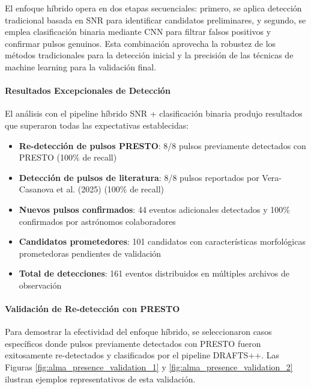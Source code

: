 El enfoque híbrido opera en dos etapas secuenciales: primero, se aplica detección tradicional basada en SNR para identificar candidatos preliminares, y segundo, se emplea clasificación binaria mediante CNN para filtrar falsos positivos y confirmar pulsos genuinos. Esta combinación aprovecha la robustez de los métodos tradicionales para la detección inicial y la precisión de las técnicas de machine learning para la validación final.

\paragraph{Resultados Excepcionales de Detección}

El análisis con el pipeline híbrido SNR + clasificación binaria produjo resultados que superaron todas las expectativas establecidas:

\begin{itemize}
    \item \textbf{Re-detección de pulsos PRESTO}: 8/8 pulsos previamente detectados con PRESTO (100\% de recall)
    \item \textbf{Detección de pulsos de literatura}: 8/8 pulsos reportados por Vera-Casanova et al. (2025) (100\% de recall)
    \item \textbf{Nuevos pulsos confirmados}: 44 eventos adicionales detectados y 100\% confirmados por astrónomos colaboradores
    \item \textbf{Candidatos prometedores}: 101 candidatos con características morfológicas prometedoras pendientes de validación
    \item \textbf{Total de detecciones}: 161 eventos distribuidos en múltiples archivos de observación
\end{itemize}

\paragraph{Validación de Re-detección con PRESTO}

Para demostrar la efectividad del enfoque híbrido, se seleccionaron casos específicos donde pulsos previamente detectados con PRESTO fueron exitosamente re-detectados y clasificados por el pipeline DRAFTS++. Las Figuras \ref{fig:alma_presence_validation_1} y \ref{fig:alma_presence_validation_2} ilustran ejemplos representativos de esta validación.

